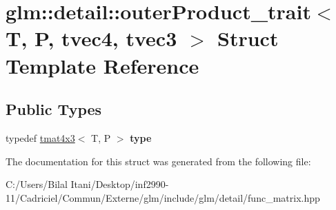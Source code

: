 \hypertarget{structglm_1_1detail_1_1outer_product__trait_3_01_t_00_01_p_00_01tvec4_00_01tvec3_01_4}{}\section{glm\+:\+:detail\+:\+:outer\+Product\+\_\+trait$<$ T, P, tvec4, tvec3 $>$ Struct Template Reference}
\label{structglm_1_1detail_1_1outer_product__trait_3_01_t_00_01_p_00_01tvec4_00_01tvec3_01_4}
\subsection*{Public Types}
\begin{DoxyCompactItemize}
\item 
typedef \hyperlink{structglm_1_1detail_1_1tmat4x3}{tmat4x3}$<$ T, P $>$ {\bfseries type}\hypertarget{structglm_1_1detail_1_1outer_product__trait_3_01_t_00_01_p_00_01tvec4_00_01tvec3_01_4_ac754af38f5684e757b9fcc70ecaea5c8}{}\label{structglm_1_1detail_1_1outer_product__trait_3_01_t_00_01_p_00_01tvec4_00_01tvec3_01_4_ac754af38f5684e757b9fcc70ecaea5c8}

\end{DoxyCompactItemize}


The documentation for this struct was generated from the following file\+:\begin{DoxyCompactItemize}
\item 
C\+:/\+Users/\+Bilal Itani/\+Desktop/inf2990-\/11/\+Cadriciel/\+Commun/\+Externe/glm/include/glm/detail/func\+\_\+matrix.\+hpp\end{DoxyCompactItemize}
